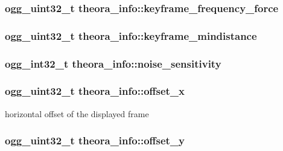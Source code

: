 \subsubsection[{keyframe\-\_\-frequency\-\_\-force}]{\setlength{\rightskip}{0pt plus 5cm}ogg\-\_\-uint32\-\_\-t theora\-\_\-info\-::keyframe\-\_\-frequency\-\_\-force}\label{structtheora__info_ad9d2e22c44a53473010e6d1042dfe0d8}
\subsubsection[{keyframe\-\_\-mindistance}]{\setlength{\rightskip}{0pt plus 5cm}ogg\-\_\-uint32\-\_\-t theora\-\_\-info\-::keyframe\-\_\-mindistance}\label{structtheora__info_aa79ca8c0e77a884d4487fd627fae32e9}
\subsubsection[{noise\-\_\-sensitivity}]{\setlength{\rightskip}{0pt plus 5cm}ogg\-\_\-int32\-\_\-t theora\-\_\-info\-::noise\-\_\-sensitivity}\label{structtheora__info_ac4789034f547b57d1075e035050eeed9}
\subsubsection[{offset\-\_\-x}]{\setlength{\rightskip}{0pt plus 5cm}ogg\-\_\-uint32\-\_\-t theora\-\_\-info\-::offset\-\_\-x}\label{structtheora__info_af5949a02bef29512f2705e6f6c944e3b}


horizontal offset of the displayed frame 

\subsubsection[{offset\-\_\-y}]{\setlength{\rightskip}{0pt plus 5cm}ogg\-\_\-uint32\-\_\-t theora\-\_\-info\-::offset\-\_\-y}\label{structtheora__info_a91c3922097ba32a85acd584a01dc2c93}


